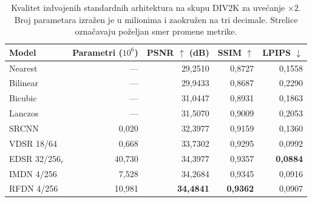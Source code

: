 \begin{table}[H]
    \centering
    \caption{Kvalitet izdvojenih standardnih arhitektura na skupu DIV2K za uvećanje $\times2$. Broj parametara izražen je u milionima i zaokružen na tri decimale. Strelice označavaju poželjan smer promene metrike.}
    \label{tab:results_2x_DIV2K}
    \begingroup
    \small
    \setlength{\tabcolsep}{4pt}
    \renewcommand{\arraystretch}{1.15}
    \begin{tabular}{@{}lrrrr@{}}
        \toprule
        Model & \shortstack{Parametri\\($10^6$)} & \shortstack{PSNR $\uparrow$\\(dB)} & SSIM $\uparrow$ & LPIPS $\downarrow$ \\
        \midrule
        Nearest & --- & 29,2510 & 0,8727 & 0,1558 \\
        Bilinear & --- & 29,9433 & 0,8687 & 0,2290 \\
        Bicubic & --- & 31,0447 & 0,8931 & 0,1863 \\
        Lanczos & --- & 31,5070 & 0,9009 & 0,2053 \\
        \midrule
        SRCNN & 0,020 & 32,3977 & 0,9159 & 0,1360 \\
        VDSR 18/64 & 0,668 & 33,7302 & 0,9295 & 0,0992 \\
        EDSR 32/256$_{r}$ & 40,730 & 34,3977 & 0,9357 & \textbf{0,0884} \\
        IMDN 4/256 & 7,528 & 34,2684 & 0,9345 & 0,0916 \\
        RFDN 4/256 & 10,981 & \textbf{34,4841} & \textbf{0,9362} & 0,0907 \\
        \bottomrule
    \end{tabular}
    \endgroup
\end{table}